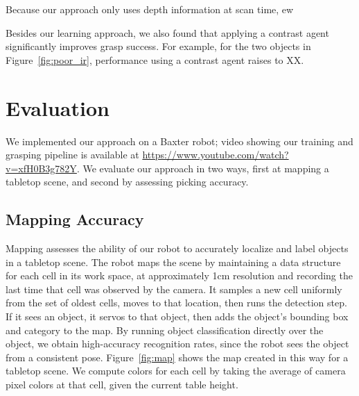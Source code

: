 \documentclass[graybox]{svmult}
\begin{document}
Because our approach only uses depth information at scan time, ew 

Besides our learning approach, we also found that applying a contrast
agent significantly improves grasp success.  For example, for the two
objects in Figure~\ref{fig:poor_ir}, performance using a contrast
agent raises to XX.



\section{Evaluation}

We implemented our approach on a Baxter robot; video showing our
training and grasping pipeline is available at
\url{https://www.youtube.com/watch?v=xfH0B3g782Y}.  We evaluate our
approach in two ways, first at mapping a tabletop scene, and second by
assessing picking accuracy.


\subsection{Mapping Accuracy}

Mapping assesses the ability of our robot to accurately localize and
label objects in a tabletop scene.  The robot maps the scene by
maintaining a data structure for each cell in its work space, at
approximately 1cm resolution and recording the last time that cell was
observed by the camera.  It samples a new cell uniformly from the set
of oldest cells, moves to that location, then runs the detection step.
If it sees an object, it servos to that object, then adds the object's
bounding box and category to the map.  By running object
classification directly over the object, we obtain high-accuracy
recognition rates, since the robot sees the object from a consistent
pose. Figure~\ref{fig:map} shows the map created in this way for a
tabletop scene.  We compute colors for each cell by taking the average
of camera pixel colors at that cell, given the current table height.
\end{document}
